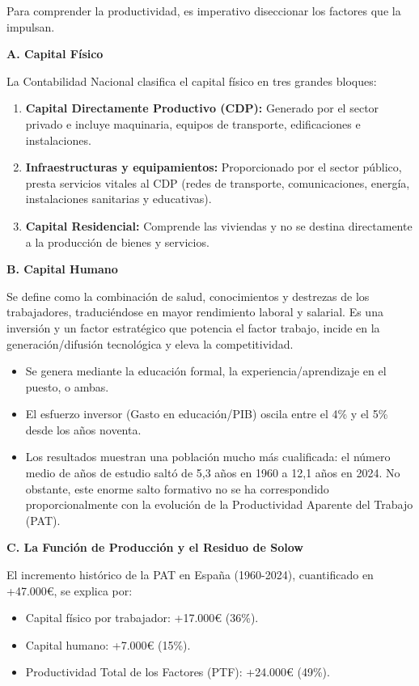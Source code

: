 Para comprender la productividad, es imperativo diseccionar los factores que la impulsan.

\textbf{A. Capital Físico}

La Contabilidad Nacional clasifica el capital físico en tres grandes bloques:

\begin{enumerate}
  \item \textbf{Capital Directamente Productivo (CDP):} Generado por el sector privado e incluye maquinaria, equipos de transporte, edificaciones e instalaciones.
  \item \textbf{Infraestructuras y equipamientos:} Proporcionado por el sector público, presta servicios vitales al CDP (redes de transporte, comunicaciones, energía, instalaciones sanitarias y educativas).
  \item \textbf{Capital Residencial:} Comprende las viviendas y no se destina directamente a la producción de bienes y servicios.
\end{enumerate}

\textbf{B. Capital Humano}

Se define como la combinación de salud, conocimientos y destrezas de los trabajadores, traduciéndose en mayor rendimiento laboral y salarial. Es una inversión y un factor estratégico que potencia el factor trabajo, incide en la generación/difusión tecnológica y eleva la competitividad.

\begin{itemize}
  \item Se genera mediante la educación formal, la experiencia/aprendizaje en el puesto, o ambas.
  \item El esfuerzo inversor (Gasto en educación/PIB) oscila entre el 4\% y el 5\% desde los años noventa.
  \item Los resultados muestran una población mucho más cualificada: el número medio de años de estudio saltó de 5,3 años en 1960 a 12,1 años en 2024. No obstante, este enorme salto formativo no se ha correspondido proporcionalmente con la evolución de la Productividad Aparente del Trabajo (PAT).
\end{itemize}

\textbf{C. La Función de Producción y el Residuo de Solow}

El incremento histórico de la PAT en España (1960-2024), cuantificado en +47.000€, se explica por:

\begin{itemize}
  \item Capital físico por trabajador: +17.000€ (36\%).
  \item Capital humano: +7.000€ (15\%).
  \item Productividad Total de los Factores (PTF): +24.000€ (49\%).
\end{itemize}

